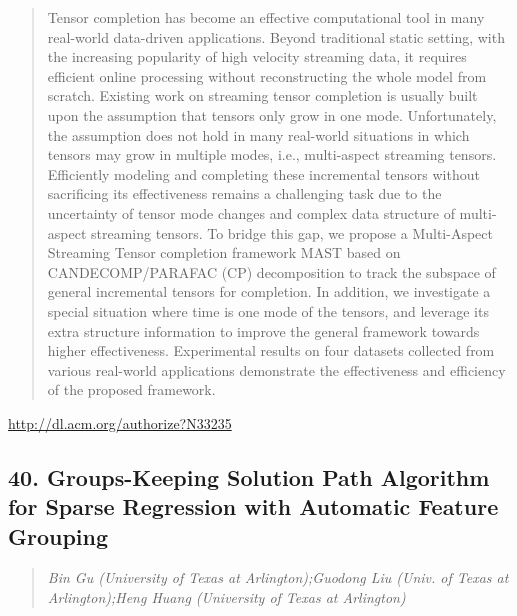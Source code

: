 \documentclass{article}
\begin{document}
\begin{quote}
Tensor completion has become an effective computational tool in many real-world data-driven applications. Beyond traditional static setting, with the increasing popularity of high velocity streaming data, it requires efficient online processing without reconstructing the whole model from scratch. Existing work on streaming tensor completion is usually built upon the assumption that tensors only grow in one mode. Unfortunately, the assumption does not hold in many real-world situations in which tensors may grow in multiple modes, i.e., multi-aspect streaming tensors. Efficiently modeling and completing these incremental tensors without sacrificing its effectiveness remains a challenging task due to the uncertainty of tensor mode changes and complex data structure of multi-aspect streaming tensors. To bridge this gap, we propose a Multi-Aspect Streaming Tensor completion framework MAST based on CANDECOMP/PARAFAC (CP) decomposition to track the subspace of general incremental tensors for completion. In addition, we investigate a special situation where time is one mode of the tensors, and leverage its extra structure information to improve the general framework towards higher effectiveness. Experimental results on four datasets collected from various real-world applications demonstrate the effectiveness and efficiency of the proposed framework.
\end{quote}

\href{http://dl.acm.org/authorize?N33235}{http://dl.acm.org/authorize?N33235}

\subsection{40. Groups-Keeping Solution Path Algorithm for Sparse Regression with Automatic Feature Grouping}

\begin{quote}
\footnotesize{\textit{Bin Gu (University of Texas at Arlington);Guodong Liu (Univ. of Texas at Arlington);Heng Huang (University of Texas at Arlington)}}

\end{quote}
\end{document}

